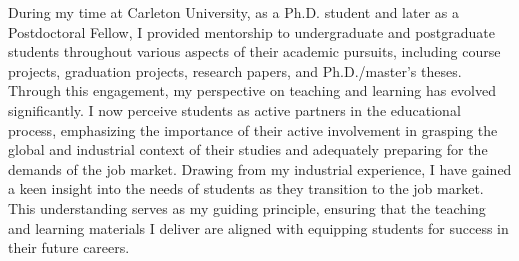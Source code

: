 \documentclass[11pt]{article}
\begin{document}

\newpage

During my time at Carleton University, as a Ph.D. student and later as a Postdoctoral Fellow, I provided mentorship to undergraduate and postgraduate students throughout various aspects of their academic pursuits, including course projects, graduation projects, research papers, and Ph.D./master's theses. Through this engagement, my perspective on teaching and learning has evolved significantly. I now perceive students as active partners in the educational process, emphasizing the importance of their active involvement in grasping the global and industrial context of their studies and adequately preparing for the demands of the job market.
Drawing from my industrial experience, I have gained a keen insight into the needs of students as they transition to the job market. This understanding serves as my guiding principle, ensuring that the teaching and learning materials I deliver are aligned with equipping students for success in their future careers.


\end{document}
